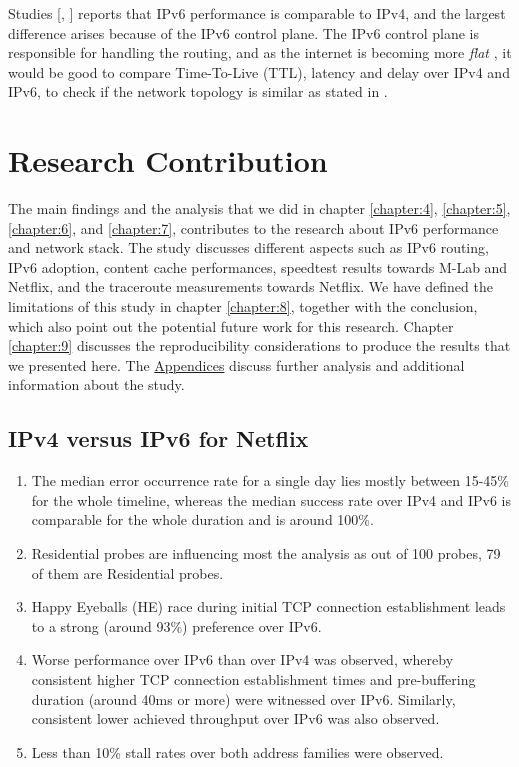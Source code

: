 Studies [\cite{ipv6mehdi}, \cite{ipv6ahmed}] reports that IPv6 performance is comparable to IPv4, and the largest difference arises because of the IPv6 control plane. The IPv6 control plane is responsible for handling the routing, and as the internet is becoming more \textit{flat} \cite{internetflat}, it would be good to compare
Time-To-Live (TTL), latency and delay over IPv4 and IPv6, to check if the network topology is similar as stated in \cite{ipv6matthew}.   

\FloatBarrier

\section{Research Contribution} 

The main findings and the analysis that we did in chapter \ref{chapter:4}, \ref{chapter:5}, \ref{chapter:6}, and  \ref{chapter:7}, contributes to the research about IPv6 performance
and network stack. The study discusses different aspects such as IPv6 routing, IPv6 adoption, content cache performances, speedtest results towards M-Lab and Netflix, and the traceroute measurements towards Netflix.
We have defined the limitations of this study in chapter \ref{chapter:8}, together with the conclusion, which also point out the potential future work for this research. Chapter \ref{chapter:9} discusses the reproducibility considerations to produce the results that we presented here.
The \hyperref[chapter:appendix]{Appendices} discuss further analysis and additional information about the study.

\subsection*{IPv4 versus IPv6 for Netflix}
\begin{enumerate}
  \item The median error occurrence rate for a single day lies mostly between 15-45\% for the whole timeline, whereas the median success rate over IPv4 and IPv6 is comparable for the whole duration and is around 100\%.
  \item Residential probes are influencing most the analysis as out of 100 probes, 79 of them are Residential probes.
  \item Happy Eyeballs (HE) race during initial TCP connection establishment leads to a strong (around 93\%) preference over IPv6.
  \item Worse performance over IPv6 than over IPv4 was observed, whereby consistent higher TCP connection establishment times and pre-buffering duration (around 40ms or more) were witnessed over IPv6. Similarly, consistent lower achieved throughput over IPv6 was also observed.
  \item Less than 10\% stall rates over both address families were observed. 
\end{enumerate}
 
